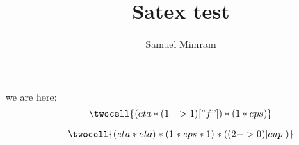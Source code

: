 \documentclass[a4paper]{article}
\title{Satex test}
\author{Samuel Mimram}
\begin{document}
\maketitle

we are here:
\[
  \twocell{(eta * (1->1)["f"]) * (1 * eps)}
\]

\[
  \twocell{(eta * eta) * (1 * eps * 1) * ((2->0)[cup])}
\]





\end{document}
